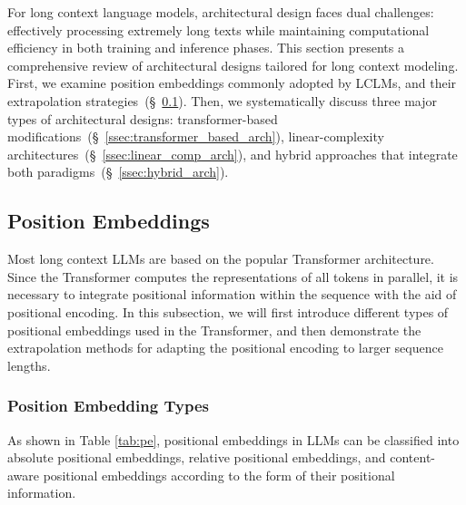 \documentclass[11pt, a4paper, logo, copyright, nonumbering]{map}
\begin{document}
\label{sec:model}





For long context language models, architectural design faces dual challenges: effectively processing extremely long texts while maintaining computational efficiency in both training and inference phases. This section presents a comprehensive review of architectural designs tailored for long context modeling. First, we examine position embeddings commonly adopted by LCLMs, and their extrapolation strategies~(\S~\ref{sec:pos_emb}). Then, we systematically discuss three major types of architectural designs: transformer-based modifications~(\S~\ref{ssec:transformer_based_arch}), linear-complexity architectures~(\S~\ref{ssec:linear_comp_arch}), and hybrid approaches that integrate both paradigms~(\S~\ref{ssec:hybrid_arch}).


\subsection{Position Embeddings}
\label{sec:pos_emb}
Most long context LLMs are based on the popular Transformer architecture. Since the Transformer computes the representations of all tokens in parallel, it is necessary to integrate positional information within the sequence with the aid of positional encoding. In this subsection, we will first introduce different types of positional embeddings used in the Transformer, and then demonstrate the extrapolation methods for adapting the positional encoding to larger sequence lengths. 

\subsubsection{Position Embedding Types}




As shown in Table \ref{tab:pe}, positional embeddings in LLMs can be classified into absolute positional embeddings, relative positional embeddings, and content-aware positional embeddings according to the form of their positional information.
\end{document}
